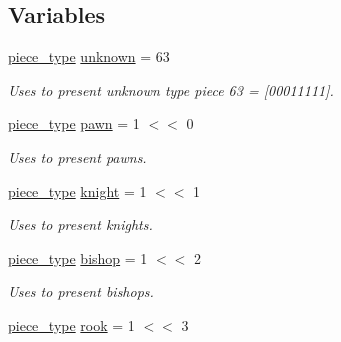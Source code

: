 \subsection*{Variables}
\begin{DoxyCompactItemize}
\item 
\hypertarget{namespaceChEngn_a538ef441c024a7e5d4c1dedb5e03fc21}{
\hyperlink{namespaceChEngn_a2a35c185f259757a78e937575b8ed483}{piece\_\-type} \hyperlink{namespaceChEngn_a538ef441c024a7e5d4c1dedb5e03fc21}{unknown} = 63}
\label{namespaceChEngn_a538ef441c024a7e5d4c1dedb5e03fc21}

\begin{DoxyCompactList}\small\item\em Uses to present unknown type piece 63 = \mbox{[}00011111\mbox{]}. \item\end{DoxyCompactList}\item 
\hypertarget{namespaceChEngn_af4781da8088272ec86e35be681dde106}{
\hyperlink{namespaceChEngn_a2a35c185f259757a78e937575b8ed483}{piece\_\-type} \hyperlink{namespaceChEngn_af4781da8088272ec86e35be681dde106}{pawn} = 1 $<$$<$ 0}
\label{namespaceChEngn_af4781da8088272ec86e35be681dde106}

\begin{DoxyCompactList}\small\item\em Uses to present pawns. \item\end{DoxyCompactList}\item 
\hypertarget{namespaceChEngn_ab167075161c66436eef6d7f02507c115}{
\hyperlink{namespaceChEngn_a2a35c185f259757a78e937575b8ed483}{piece\_\-type} \hyperlink{namespaceChEngn_ab167075161c66436eef6d7f02507c115}{knight} = 1 $<$$<$ 1}
\label{namespaceChEngn_ab167075161c66436eef6d7f02507c115}

\begin{DoxyCompactList}\small\item\em Uses to present knights. \item\end{DoxyCompactList}\item 
\hypertarget{namespaceChEngn_ad9410a19494f941d06ea404edf4900b0}{
\hyperlink{namespaceChEngn_a2a35c185f259757a78e937575b8ed483}{piece\_\-type} \hyperlink{namespaceChEngn_ad9410a19494f941d06ea404edf4900b0}{bishop} = 1 $<$$<$ 2}
\label{namespaceChEngn_ad9410a19494f941d06ea404edf4900b0}

\begin{DoxyCompactList}\small\item\em Uses to present bishops. \item\end{DoxyCompactList}\item 
\hypertarget{namespaceChEngn_a485787ab76caf7a61a77118fcdfd113d}{
\hyperlink{namespaceChEngn_a2a35c185f259757a78e937575b8ed483}{piece\_\-type} \hyperlink{namespaceChEngn_a485787ab76caf7a61a77118fcdfd113d}{rook} = 1 $<$$<$ 3}
\label{namespaceChEngn_a485787ab76caf7a61a77118fcdfd113d}


\end{DoxyCompactItemize}
